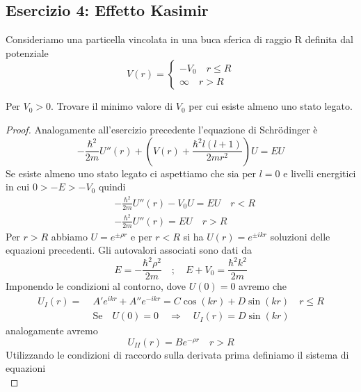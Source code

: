 \subsection{Esercizio 4: Effetto Kasimir}

Consideriamo una particella vincolata in una buca sferica di raggio R definita dal  potenziale 
\begin{equation*}
	V(r) = \left \{ \begin{array}{l}
		-V_0 \quad r \leq R \\
		\infty \quad r > R
	\end{array}\right.
\end{equation*} 
\newpage

Per $V_0 > 0$. Trovare il minimo valore di $V_0$ per cui esiste almeno uno stato legato.

\begin{proof}
	Analogamente all'esercizio precedente l'equazione di Schr\"odinger \`e 
\begin{equation*}
	-\frac{\hbar^2}{2m}U''(r) + \left ( V(r) + \frac{\hbar^2 l(l+1)}{2mr^2}\right)U = EU
\end{equation*}	 
Se esiste almeno uno stato legato ci aspettiamo che sia per $l = 0$ e livelli energitici in cui $0 >-E>-V_0$ quindi
\begin{align*}
	& -\frac{\hbar^2}{2m}U''(r)  -V_0 U = EU \quad r < R\\[0.5cm] 
	& -\frac{\hbar^2}{2m}U''(r)  = EU \quad r > R
\end{align*}
Per $r > R$ abbiamo $U = e^{\pm \rho r}$ e per $r < R$ si ha $U(r) = e^{\pm ikr}$ soluzioni delle equazioni precedenti. Gli autovalori associati sono dati da 
\begin{equation}
	E = - \frac{\hbar^2 \rho^2}{2m} \quad ; \quad 
	 E + V_0 = \frac{\hbar^2k^2}{2m}
\end{equation}
Imponendo le condizioni al contorno, dove $U(0) = 0$ avremo che 
\begin{align*}
	U_I(r) = & \; A'e^{ikr} + A''e^{-ikr} = C \cos(kr) + D\sin(kr)  \quad r \leq R \\[0.5cm]
	 & \; \text{Se} \quad  U(0) = 0 \quad  \Rightarrow \quad U_I(r) = D\sin(kr)
\end{align*}
analogamente avremo 
\begin{equation*}
U_{II}(r) = Be^{- \rho r} \quad r > R	
\end{equation*}
Utilizzando le condizioni di raccordo sulla derivata prima definiamo il sistema di equazioni 
\begin{equation*}

\end{equation*}
\end{proof}
